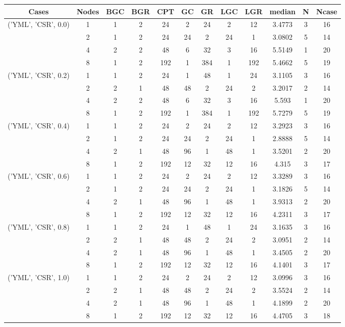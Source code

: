 \begin{tabular}{cccccccccccc}
\hline
Cases & Nodes& BGC& BGR& CPT& GC& GR& LGC& LGR& median & N & Ncase \\
\hline
\multirow{4}{*}{('YML', 'CSR', 0.0)}& 1& 1& 2& 24& 2& 24& 2& 12& 3.4773& 3& 16\\
& 2& 1& 2& 24& 24& 2& 24& 1& 3.0802& 5& 14\\
& 4& 2& 2& 48& 6& 32& 3& 16& 5.5149& 1& 20\\
& 8& 1& 2& 192& 1& 384& 1& 192& 5.4662& 5& 19\\
\hline
\multirow{4}{*}{('YML', 'CSR', 0.2)}& 1& 1& 2& 24& 1& 48& 1& 24& 3.1105& 3& 16\\
& 2& 2& 1& 48& 48& 2& 24& 2& 3.2017& 2& 14\\
& 4& 2& 2& 48& 6& 32& 3& 16& 5.593& 1& 20\\
& 8& 1& 2& 192& 1& 384& 1& 192& 5.7279& 5& 19\\
\hline
\multirow{4}{*}{('YML', 'CSR', 0.4)}& 1& 1& 2& 24& 2& 24& 2& 12& 3.2923& 3& 16\\
& 2& 1& 2& 24& 24& 2& 24& 1& 2.8888& 5& 14\\
& 4& 2& 1& 48& 96& 1& 48& 1& 3.5201& 2& 20\\
& 8& 1& 2& 192& 12& 32& 12& 16& 4.315& 3& 17\\
\hline
\multirow{4}{*}{('YML', 'CSR', 0.6)}& 1& 1& 2& 24& 2& 24& 2& 12& 3.3289& 3& 16\\
& 2& 1& 2& 24& 24& 2& 24& 1& 3.1826& 5& 14\\
& 4& 2& 1& 48& 96& 1& 48& 1& 3.9313& 2& 20\\
& 8& 1& 2& 192& 12& 32& 12& 16& 4.2311& 3& 17\\
\hline
\multirow{4}{*}{('YML', 'CSR', 0.8)}& 1& 1& 2& 24& 1& 48& 1& 24& 3.1635& 3& 16\\
& 2& 2& 1& 48& 48& 2& 24& 2& 3.0951& 2& 14\\
& 4& 2& 1& 48& 96& 1& 48& 1& 3.4505& 2& 20\\
& 8& 1& 2& 192& 12& 32& 12& 16& 4.1401& 3& 17\\
\hline
\multirow{4}{*}{('YML', 'CSR', 1.0)}& 1& 1& 2& 24& 2& 24& 2& 12& 3.0996& 3& 16\\
& 2& 2& 1& 48& 48& 2& 24& 2& 3.5524& 2& 14\\
& 4& 2& 1& 48& 96& 1& 48& 1& 4.1899& 2& 20\\
& 8& 1& 2& 192& 12& 32& 12& 16& 4.4705& 3& 18\\
\hline
\end{tabular}
